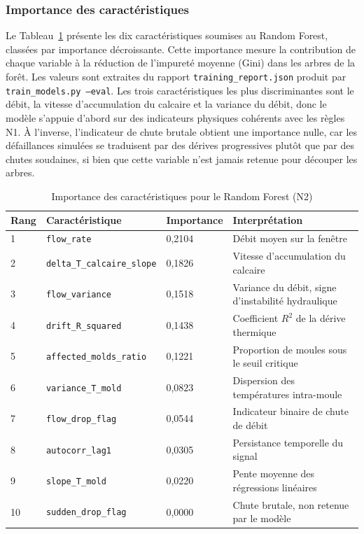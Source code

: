 \subsubsection{Importance des caractéristiques}

Le Tableau~\ref{tab:feature_importance} présente les dix caractéristiques soumises au Random Forest, classées par importance décroissante. Cette importance mesure la contribution de chaque variable à la réduction de l'impureté moyenne (Gini) dans les arbres de la forêt. Les valeurs sont extraites du rapport \texttt{training\_report.json} produit par \texttt{train\_models.py --eval}. Les trois caractéristiques les plus discriminantes sont le débit, la vitesse d'accumulation du calcaire et la variance du débit, donc le modèle s'appuie d'abord sur des indicateurs physiques cohérents avec les règles N1. À l'inverse, l'indicateur de chute brutale obtient une importance nulle, car les défaillances simulées se traduisent par des dérives progressives plutôt que par des chutes soudaines, si bien que cette variable n'est jamais retenue pour découper les arbres.

\begin{table}[htbp]
\centering
\renewcommand{\arraystretch}{1.45}
\caption{Importance des caractéristiques pour le Random Forest (N2)}
\label{tab:feature_importance}
\begin{tabular}{|p{}|p{}|p{}|p{}|}
\hline
\rowcolor{gray!25}
\textbf{Rang} & \textbf{Caractéristique} & \textbf{Importance} & \textbf{Interprétation} \\
\hline
1 & \texttt{flow\_rate} & 0{,}2104 & Débit moyen sur la fenêtre \\
\hline
2 & \texttt{delta\_T\_calcaire\_slope} & 0{,}1826 & Vitesse d'accumulation du calcaire \\
\hline
3 & \texttt{flow\_variance} & 0{,}1518 & Variance du débit, signe d'instabilité hydraulique \\
\hline
4 & \texttt{drift\_R\_squared} & 0{,}1438 & Coefficient \(R^2\) de la dérive thermique \\
\hline
5 & \texttt{affected\_molds\_ratio} & 0{,}1221 & Proportion de moules sous le seuil critique \\
\hline
6 & \texttt{variance\_T\_mold} & 0{,}0823 & Dispersion des températures intra-moule \\
\hline
7 & \texttt{flow\_drop\_flag} & 0{,}0544 & Indicateur binaire de chute de débit \\
\hline
8 & \texttt{autocorr\_lag1} & 0{,}0305 & Persistance temporelle du signal \\
\hline
9 & \texttt{slope\_T\_mold} & 0{,}0220 & Pente moyenne des régressions linéaires \\
\hline
10 & \texttt{sudden\_drop\_flag} & 0{,}0000 & Chute brutale, non retenue par le modèle \\
\hline
\end{tabular}
\end{table}

